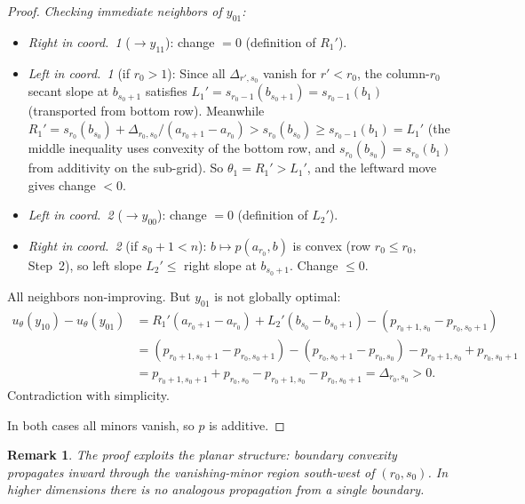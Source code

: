 \documentclass[11pt]{article}
\newtheorem{remark}[theorem]{Remark}
\begin{document}
\begin{proof}
\emph{Checking immediate neighbors of $y_{01}$:}
\begin{itemize}
  \item \emph{Right in coord.~1} ($\to y_{11}$): change $= 0$
    (definition of $R_1'$).

  \item \emph{Left in coord.~1} (if $r_0 > 1$):
    Since all $\Delta_{r',s_0}$ vanish for $r' < r_0$, the
    column-$r_0$ secant slope at $b_{s_0+1}$ satisfies
    $L_1' = s_{r_0-1}(b_{s_0+1}) = s_{r_0-1}(b_1)$ (transported from
    bottom row).  Meanwhile
    $R_1' = s_{r_0}(b_{s_0}) + \Delta_{r_0,s_0} / (a_{r_0+1} - a_{r_0})
    > s_{r_0}(b_{s_0}) \geq s_{r_0-1}(b_1) = L_1'$
    (the middle inequality uses convexity of the bottom row, and
    $s_{r_0}(b_{s_0}) = s_{r_0}(b_1)$ from additivity on the sub-grid).
    So $\theta_1 = R_1' > L_1'$, and the leftward move gives change $< 0$.

  \item \emph{Left in coord.~2} ($\to y_{00}$): change $= 0$
    (definition of $L_2'$).

  \item \emph{Right in coord.~2} (if $s_0 + 1 < n$):
    $b \mapsto p(a_{r_0}, b)$ is convex (row $r_0 \leq r_0$, Step~2),
    so left slope $L_2' \leq$ right slope at $b_{s_0+1}$.
    Change $\leq 0$.
\end{itemize}

All neighbors non-improving.  But $y_{01}$ is not globally optimal:
\begin{align*}
  u_\theta(y_{10}) - u_\theta(y_{01})
  &= R_1'(a_{r_0+1} - a_{r_0}) + L_2'(b_{s_0} - b_{s_0+1})
  - (p_{r_0+1,s_0} - p_{r_0,s_0+1}) \\
  &= (p_{r_0+1,s_0+1} - p_{r_0,s_0+1})
  - (p_{r_0,s_0+1} - p_{r_0,s_0})
  - p_{r_0+1,s_0} + p_{r_0,s_0+1} \\
  &= p_{r_0+1,s_0+1} + p_{r_0,s_0} - p_{r_0+1,s_0} - p_{r_0,s_0+1}
  = \Delta_{r_0,s_0} > 0.
\end{align*}
Contradiction with simplicity.

\medskip
In both cases all minors vanish, so $p$ is additive.
\end{proof}

\begin{remark}\label{rem:2d-mechanism}
The proof exploits the \emph{planar} structure: boundary convexity
propagates inward through the vanishing-minor region south-west of
$(r_0, s_0)$.  In higher dimensions there is no analogous propagation
from a single boundary.
\end{remark}
\end{document}
